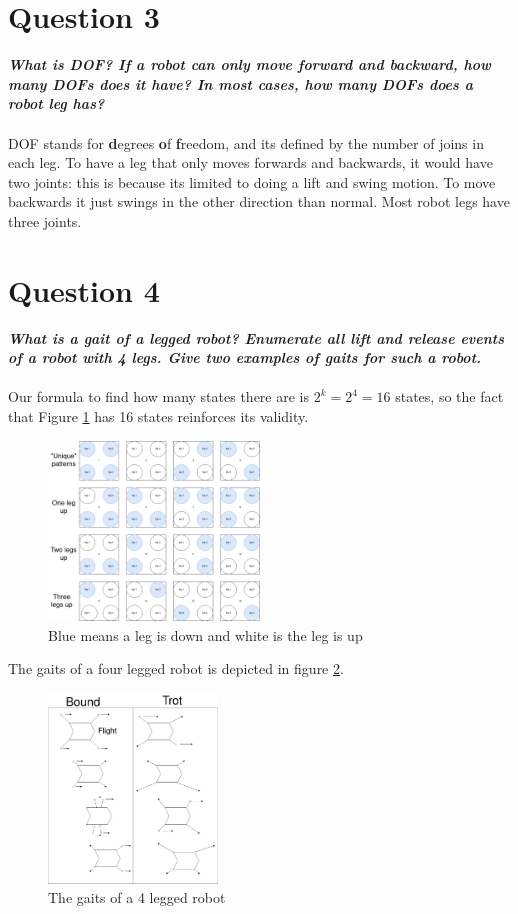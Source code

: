 \documentclass{article}
\newcommand\tab[1][1cm]{\hspace*{#1}}
\begin{document}
\section*{Question 3}
\textbf{\textit{
    \tab What is DOF? If a robot can only move forward and backward, 
    how many DOFs does it have? In most cases, how many DOFs does a robot leg has?
}} \\ \\
DOF stands for \textbf{d}egrees \textbf{o}f \textbf{f}reedom, and its defined by the
number of joins in each leg. To have a leg that only moves forwards and backwards,
it would have two joints: this is because its limited to doing a lift and swing motion.
To move backwards it just swings in the other direction than normal. Most robot legs
have three joints.
\newpage
\section*{Question 4}
\textbf{\textit{
    \tab What is a gait of a legged robot? Enumerate all lift and release 
    events of a robot with 4 legs. Give two examples of gaits for such a robot.
}} \\ \\
Our formula to find how many states there are is $2^k = 2^4 = 16$ states, so the
fact that Figure \ref{gait} has 16 states reinforces its validity.
\begin{figure}[ht]
    \centering
    \includegraphics[width=0.5\textwidth]{img/gait.png}
    \caption{Blue means a leg is down and white is the leg is up}
    \label{gait}
\end{figure}

The gaits of a four legged robot is depicted in figure \ref{gait-walk}.
\begin{figure}[ht]
    \centering
    \includegraphics[width=0.4\textwidth]{img/gait-walk.png}
    \caption{The gaits of a 4 legged robot}
    \label{gait-walk}
\end{figure}
\newpage
\end{document}

